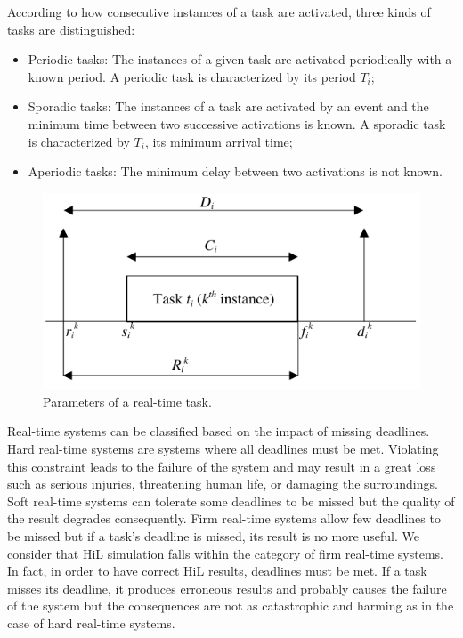 \noindent According to how consecutive instances of a task are activated, three kinds of tasks are distinguished:
\begin{itemize}
\item Periodic tasks: The instances of a given task are activated periodically with a known period. A periodic task is characterized by its period $T_i$;
\item Sporadic tasks: The instances of a task are activated by an event and the minimum time between two successive activations is known. A sporadic task is characterized by $T_i$, its minimum arrival time;
\item Aperiodic tasks: The minimum delay between two activations is not known.
\end{itemize} 

\begin{figure}[h]
\centering
\captionsetup{justification=centering}
\includegraphics{figures/taskmodel}
\caption{Parameters of a real-time task.}
\label{fig:taskmodel}
\end{figure} 

Real-time systems can be classified based on the impact of missing deadlines. Hard real-time systems are systems where all deadlines must be met. Violating this constraint leads to the failure of the system and may result in a great loss such as serious injuries, threatening human life, or damaging the surroundings. Soft real-time systems can tolerate some deadlines to be missed but the quality of the result degrades consequently. Firm real-time systems allow few deadlines to be missed but if a task's deadline is missed, its result is no more useful. We consider that HiL simulation falls within the category of firm real-time systems. In fact, in order to have correct HiL results, deadlines must be met. If a task misses its deadline, it produces erroneous results and probably causes the failure of the system but the consequences are not as catastrophic and harming as in the case of hard real-time systems.   

